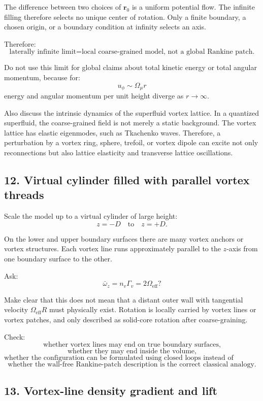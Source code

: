 \documentclass[11pt,a4paper]{article}
\begin{document}
The difference between two choices of \(\mathbf{r}_0\) is a uniform potential flow. The infinite filling therefore selects no unique center of rotation. Only a finite boundary, a chosen origin, or a boundary condition at infinity selects an axis.

Therefore:
\[
\boxed{
\text{laterally infinite limit}
=
\text{local coarse-grained model, not a global Rankine patch.}
}
\]

Do not use this limit for global claims about total kinetic energy or total angular momentum, because for:
\[
u_{\phi}\sim\Omega_{\mu}r
\]
energy and angular momentum per unit height diverge as \(r\rightarrow\infty\).

Also discuss the intrinsic dynamics of the superfluid vortex lattice. In a quantized superfluid, the coarse-grained field is not merely a static background. The vortex lattice has elastic eigenmodes, such as Tkachenko waves. Therefore, a perturbation by a vortex ring, sphere, trefoil, or vortex dipole can excite not only reconnections but also lattice elasticity and transverse lattice oscillations.

\subsection{12. Virtual cylinder filled with parallel vortex threads}

Scale the model up to a virtual cylinder of large height:
\[
z=-D
\quad\text{to}\quad
z=+D.
\]

On the lower and upper boundary surfaces there are many vortex anchors or vortex structures. Each vortex line runs approximately parallel to the \(z\)-axis from one boundary surface to the other.

Ask:
\[
\bar{\omega}_z
=
n_v\Gamma_v
=
2\Omega_{\mathrm{eff}}?
\]

Make clear that this does not mean that a distant outer wall with tangential velocity \(\Omega_{\mathrm{eff}}R\) must physically exist. Rotation is locally carried by vortex lines or vortex patches, and only described as solid-core rotation after coarse-graining.

Check:
\[
\text{whether vortex lines may end on true boundary surfaces,}
\]
\[
\text{whether they may end inside the volume,}
\]
\[
\text{whether the configuration can be formulated using closed loops instead of anchors,}
\]
\[
\text{whether the wall-free Rankine-patch description is the correct classical analogy.}
\]

\subsection{13. Vortex-line density gradient and lift}
\end{document}
